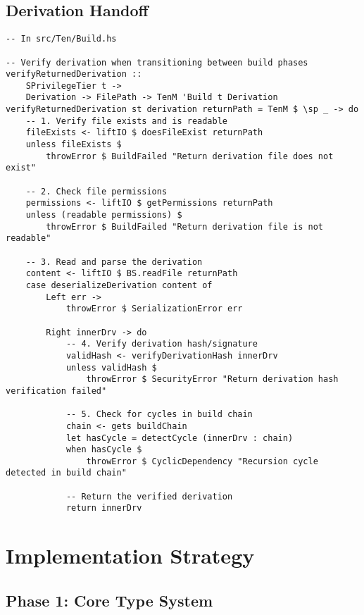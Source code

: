 \documentclass{article}
\begin{document}
\subsection{Derivation Handoff}

\begin{tcolorbox}[title=Derivation Handoff Validation]
\begin{verbatim}
-- In src/Ten/Build.hs

-- Verify derivation when transitioning between build phases
verifyReturnedDerivation ::
    SPrivilegeTier t ->
    Derivation -> FilePath -> TenM 'Build t Derivation
verifyReturnedDerivation st derivation returnPath = TenM $ \sp _ -> do
    -- 1. Verify file exists and is readable
    fileExists <- liftIO $ doesFileExist returnPath
    unless fileExists $
        throwError $ BuildFailed "Return derivation file does not exist"

    -- 2. Check file permissions
    permissions <- liftIO $ getPermissions returnPath
    unless (readable permissions) $
        throwError $ BuildFailed "Return derivation file is not readable"

    -- 3. Read and parse the derivation
    content <- liftIO $ BS.readFile returnPath
    case deserializeDerivation content of
        Left err ->
            throwError $ SerializationError err

        Right innerDrv -> do
            -- 4. Verify derivation hash/signature
            validHash <- verifyDerivationHash innerDrv
            unless validHash $
                throwError $ SecurityError "Return derivation hash verification failed"

            -- 5. Check for cycles in build chain
            chain <- gets buildChain
            let hasCycle = detectCycle (innerDrv : chain)
            when hasCycle $
                throwError $ CyclicDependency "Recursion cycle detected in build chain"

            -- Return the verified derivation
            return innerDrv
\end{verbatim}
\end{tcolorbox}

\newpage
\section{Implementation Strategy}

\subsection{Phase 1: Core Type System}
\end{document}
